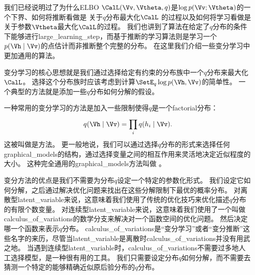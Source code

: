 我们已经说明过了为什么\gls{ELBO} $\CalL(\Vv,\Vtheta,q)$是$\log  p(\Vv;\Vtheta)$的一个下界、如何将推断看做是 关于$q$分布最大化$\CalL$ 的过程以及如何将学习看做是关于参数$\Vtheta$最大化$\CalL$的过程。
我们也讲到了算法在给定了$q$分布的条件下能够进行\gls{large_learning_step}，而基于推断的学习算法则是学习一个$p(\Vh \mid \Vv)$的点估计而非推断整个完整的分布。
在这里我们介绍一些变分学习中更加通用的算法。


变分学习的核心思想就是我们通过选择给定有约束的分布族中一个$q$分布来最大化$\CalL$。
选择这个分布族时应该考虑到计算$\SetE_q \log p(\Vh,\Vv)$的简单性。
一个典型的方法就是添加一些$q$分布如何分解的假设。


一种常用的变分学习的方法是加入一些限制使得$q$是一个\gls{factorial}分布：
\begin{align}
	q(\Vh\mid\Vv) = \prod_{i}^{}q(h_i \mid \Vv).
\end{align}
这被叫做是方法。
更一般地说，我们可以通过选择$q$分布的形式来选择任何\gls{graphical_models}的结构，通过选择变量之间的相互作用来灵活地决定近似程度的大小。
这种完全通用的\gls{graphical_models}方法叫做 \citep{Saul96}。


变分方法的优点是我们不需要为分布$q$设定一个特定的参数化形式。
我们设定它如何分解，之后通过解决优化问题来找出在这些分解限制下最优的概率分布。
对离散型\gls{latent_variable}来说，这意味着我们使用了传统的优化技巧来优化描述$q$分布的有限个数变量。
对连续型\gls{latent_variable}来说，这意味着我们使用了一个叫做\gls{calculus_of_variations}的数学分支来解决对一个函数空间的优化问题。
然后决定哪一个函数来表示$q$分布。
\gls{calculus_of_variations}是``变分学习''或者``变分推断''这些名字的来历，尽管当\gls{latent_variable}是离散时\gls{calculus_of_variations}并没有用武之地。
当遇到连续型\gls{latent_variable}时，\gls{calculus_of_variations}不需要过多地人工选择模型，是一种很有用的工具。
我们只需要设定分布$q$如何分解，而不需要去猜测一个特定的能够精确近似原后验分布的$q$分布。


